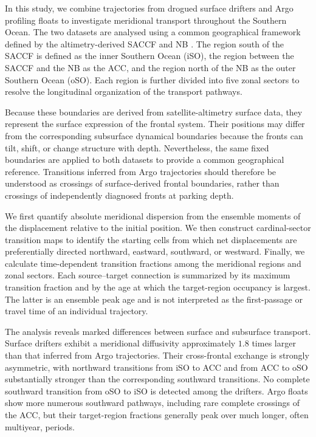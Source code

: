 \documentclass[
  draft
]{agujournal2025}
\begin{document}
        In this study, we combine trajectories from drogued surface drifters and Argo profiling floats to investigate meridional transport throughout the Southern Ocean. The two datasets are analysed using a common geographical framework defined by the altimetry-derived SACCF and NB \cite{data:park2019,art:park2019}. The region south of the SACCF is defined as the inner Southern Ocean (iSO), the region between the SACCF and the NB as the ACC, and the region north of the NB as the outer Southern Ocean (oSO). Each region is further divided into five zonal sectors to resolve the longitudinal organization of the transport pathways. 
        
        Because these boundaries are derived from satellite-altimetry surface data, they represent the surface expression of the frontal system. Their positions may differ from the corresponding subsurface dynamical boundaries because the fronts can tilt, shift, or change structure with depth. Nevertheless, the same fixed boundaries are applied to both datasets to provide a common geographical reference. Transitions inferred from Argo trajectories should therefore be understood as crossings of surface-derived frontal boundaries, rather than crossings of independently diagnosed fronts at parking depth. 
        
        We first quantify absolute meridional dispersion from the ensemble moments of the displacement relative to the initial position. We then construct cardinal-sector transition maps to identify the starting cells from which net displacements are preferentially directed northward, eastward, southward, or westward. Finally, we calculate time-dependent transition fractions among the meridional regions and zonal sectors. Each source--target connection is summarized by its maximum transition fraction and by the age at which the target-region occupancy is largest. The latter is an ensemble peak age and is not interpreted as the first-passage or travel time of an individual trajectory.

        The analysis reveals marked differences between surface and subsurface transport. Surface drifters exhibit a meridional diffusivity approximately $1.8$ times larger than that inferred from Argo trajectories. Their cross-frontal exchange is strongly asymmetric, with northward transitions from iSO to ACC and from ACC to oSO substantially stronger than the corresponding southward transitions. No complete southward transition from oSO to iSO is detected among the drifters. Argo floats show more numerous southward pathways, including rare complete crossings of the ACC, but their target-region fractions generally peak over much longer, often multiyear, periods.
\end{document}
